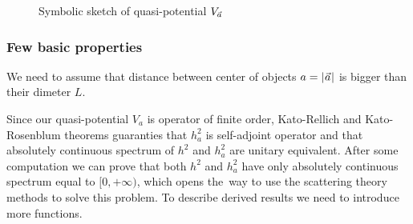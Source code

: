 \documentclass[10pt,t]{beamer}
\begin{document}
\begin{frame}
\begin{figure}

    \caption{Symbolic sketch of quasi-potential $V_{ \vec{a} }$}


  \end{figure}

\end{frame}





\begin{frame}
  \frametitle{Few basic properties}


  We need to assume that distance between center of objects
  $a = | \hspace{0.05em}  \vec{a}  \hspace{0.05em} |$ is bigger than their dimeter $L$.

  Since our quasi-potential $V_{ a }$ is operator of finite order,
  Kato-Rellich and Kato-Rosenblum theorems guaranties that $h_{ a }^{ 2 }$ is
  self-adjoint operator and that absolutely continuous spectrum of
  $h^{ 2 }$ and $h_{ a }^{ 2 }$ are unitary equivalent. After some
  computation we can prove that both $h^{ 2 }$ and $h_{ a }^{ 2 }$ have only
  absolutely continuous spectrum equal to $[ 0, +\infty )$, which opens
  the~way to use the scattering theory methods to solve this problem. To
  describe derived results we need to introduce more functions.

\end{frame}
\end{document}
